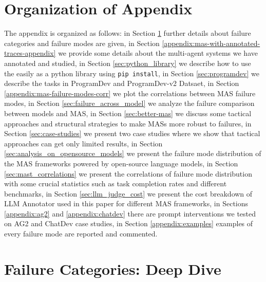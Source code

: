 \appendix
\onecolumn %

\section*{Organization of Appendix}

The appendix is organized as follows: 
in Section \ref{sec:fc-deep-dive} further details about failure categories and failure modes are given, 
in Section \ref{appendix:mas-with-annotated-traces-appendix} we provide some details about the multi-agent systems we have annotated and studied, 
in Section \ref{sec:python_library} we describe how to use the \taxonomy{} easily as a python library using \verb|pip install|,
in Section \ref{sec:programdev} we describe the tasks in ProgramDev and ProgramDev-v2 Datsaet,
in Section \ref{appendix:mas-failure-modes-corr} we plot the correlations between MAS failure modes, 
in Section \ref{sec:failure_across_model} we analyze the failure comparison between models and MAS,
in Section \ref{sec:better-mas} we discuss some tactical approaches and structural strategies to make MASs more robust to failures, 
in Section \ref{sec:case-studies} we present two case studies where we show that tactical approaches can get only limited results,
in Section \ref{sec:analysis_on_opensource_models} we present the failure mode distribution of the MAS frameworks powered by open-source language models,
in Section \ref{sec:mast_correlations} we present the correlations of failure mode distribution with some crucial statistics such as task completion rates and different benchmarks,
in Section \ref{sec:llm_judge_cost} we present the cost breakdown of LLM Annotator used in this paper for different MAS frameworks,
in Sections \ref{appendix:ag2} and \ref{appendix:chatdev} there are prompt interventions we tested on AG2 and ChatDev case studies,
in Section \ref{appendix:examples} examples of every failure mode are reported and commented. 

\section{\taxonomy Failure Categories: Deep Dive}
\label{sec:fc-deep-dive}

